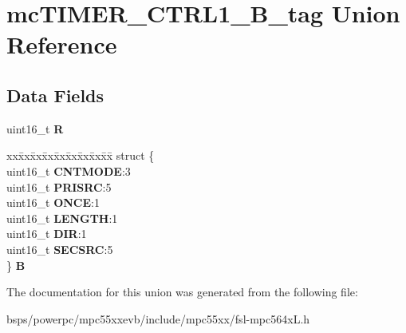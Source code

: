 \hypertarget{unionmcTIMER__CTRL1__16B__tag}{}\section{mc\+T\+I\+M\+E\+R\+\_\+\+C\+T\+R\+L1\+\_\+B\+\_\+tag Union Reference}
\label{unionmcTIMER__CTRL1__16B__tag}
\subsection*{Data Fields}
\begin{DoxyCompactItemize}
\item 
\mbox{\label{unionmcTIMER__CTRL1__16B__tag_a0990b8dab9035576e028e64b3acae4a3}} 
uint16\+\_\+t {\bfseries R}
\item 
\mbox{\label{unionmcTIMER__CTRL1__16B__tag_a5a0cfc134f89d2dd33cf6e6bc311d781}} 
\begin{tabbing}
xx\=xx\=xx\=xx\=xx\=xx\=xx\=xx\=xx\=\kill
struct \{\\
\>uint16\_t {\bfseries CNTMODE}:3\\
\>uint16\_t {\bfseries PRISRC}:5\\
\>uint16\_t {\bfseries ONCE}:1\\
\>uint16\_t {\bfseries LENGTH}:1\\
\>uint16\_t {\bfseries DIR}:1\\
\>uint16\_t {\bfseries SECSRC}:5\\
\} {\bfseries B}\\

\end{tabbing}\end{DoxyCompactItemize}


The documentation for this union was generated from the following file\+:\begin{DoxyCompactItemize}
\item 
bsps/powerpc/mpc55xxevb/include/mpc55xx/fsl-\/mpc564x\+L.\+h\end{DoxyCompactItemize}
